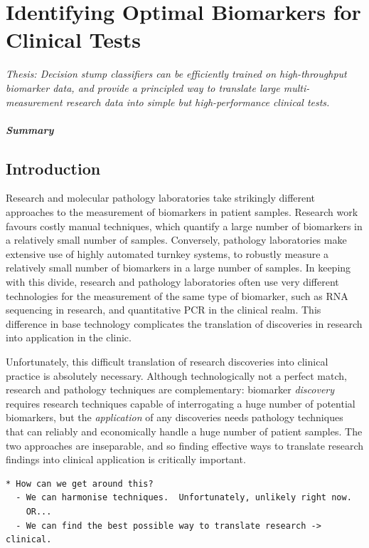 \documentclass[dissertation.tex]{subfiles}
\begin{document}
\chapter[Identifying Optimal Biomarkers for Clinical Tests][Finding Optimal Biomarkers]{Identifying Optimal Biomarkers for Clinical Tests}
\label{chap:messina}


\emph{Thesis: Decision stump classifiers can be efficiently trained on high-throughput biomarker data, and provide a principled way to translate large multi-measurement research data into simple but high-performance clinical tests.}


\paragraph{Summary}


\section{Introduction}

Research and molecular pathology laboratories take strikingly different approaches to the measurement of biomarkers in patient samples.  Research work favours costly manual techniques, which quantify a large number of biomarkers in a relatively small number of samples.  Conversely, pathology laboratories make extensive use of highly automated turnkey systems, to robustly measure a relatively small number of biomarkers in a large number of samples.  In keeping with this divide, research and pathology laboratories often use very different technologies for the measurement of the same type of biomarker, such as RNA sequencing in research, and quantitative PCR in the clinical realm.  This difference in base technology complicates the translation of discoveries in research into application in the clinic.

Unfortunately, this difficult translation of research discoveries into clinical practice is absolutely necessary.  Although technologically not a perfect match, research and pathology techniques are complementary: biomarker \emph{discovery} requires research techniques capable of interrogating a huge number of potential biomarkers, but the \emph{application} of any discoveries needs pathology techniques that can reliably and economically handle a huge number of patient samples.  The two approaches are inseparable, and so finding effective ways to translate research findings into clinical application is critically important.  
\begin{verbatim}
* How can we get around this?
  - We can harmonise techniques.  Unfortunately, unlikely right now.
    OR...
  - We can find the best possible way to translate research -> clinical.
\end{verbatim}
\end{document}
